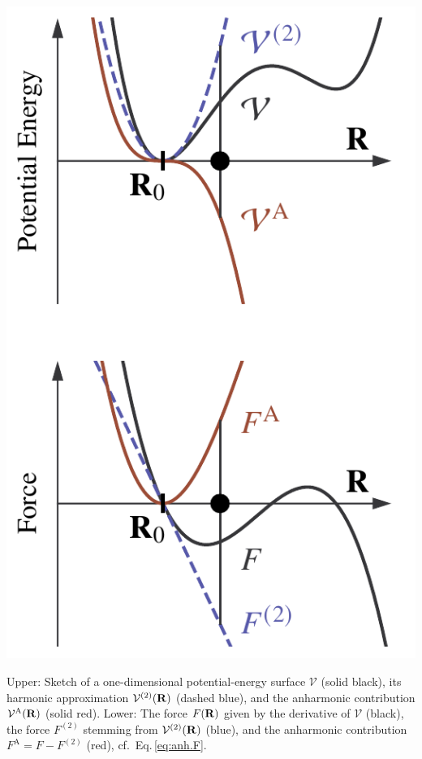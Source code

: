\begin{marginfigure}
	\centering
	\includegraphics[width=\textwidth]{./data/plots/anharmonicity/1_pes_sketch/sketch_vertical.pdf}
	\caption{Upper: Sketch of a one-dimensional potential-energy surface $\mathcal V$ (solid black), its harmonic approximation $\mathcal{V}^{(2)} ({\bf R})$ (dashed blue), and the anharmonic contribution $\mathcal{V}^{\rm A} ({\bf R})$ (solid red). Lower: The force ${F} ({\bf R})$ given by the derivative of $\mathcal V$ (black), the force $F^{(2)}$ stemming from $\mathcal{V}^{(2)} ({\bf R})$ (blue), and the anharmonic contribution $F^\mathrm{A} = F - F^{(2)}$ (red), cf.~Eq.\,\eqref{eq:anh.F}.}
	\label{fig:pes_sketch_vertical}
\end{marginfigure}


